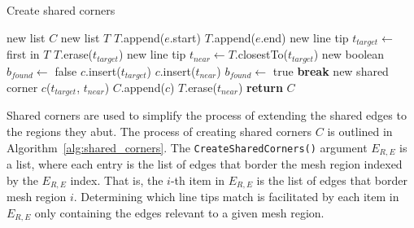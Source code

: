 \begin{algorithm}[!b]
	\caption{Create shared corners}\label{alg:shared_corners}
\begin{algorithmic}[1]
	\State new list $C$ 
		\State new list $T$ 
			\State $T$.append($e$.start)
			\State $T$.append($e$.end)
		\EndFor
			\State new line tip $t_{target} \leftarrow$ first in $T$
			\State $T$.erase($t_{target}$)
			\State new line tip $t_{near} \leftarrow T$.closestTo($t_{target}$)
			\State new boolean $b_{found} \leftarrow$ false
					\State $c$.insert($t_{target}$)
					\State $c$.insert($t_{near}$)
					\State $b_{found} \leftarrow$ true
					\State \textbf{break}
				\EndIf
			\EndFor
				\State new shared corner $c$($t_{target}$, $t_{near}$)
				\State $C$.append($c$)
			\EndIf
			\State $T$.erase($t_{near}$)
		\EndWhile
	\EndFor
	\State \textbf{return} $C$
\EndFunction
\end{algorithmic}
\end{algorithm}

Shared corners are used to simplify the process of extending the shared edges to the regions they abut.
The process of creating shared corners $C$ is outlined in Algorithm~\ref{alg:shared_corners}.
The \verb|CreateSharedCorners()| argument $E_{R,E}$ is a list, where each entry is the list of edges that border the mesh region indexed by the $E_{R,E}$ index.
That is, the $i$-th item in $E_{R,E}$ is the list of edges that border mesh region $i$.
Determining which line tips match is facilitated by each item in $E_{R,E}$ only containing the edges relevant to a given mesh region.

